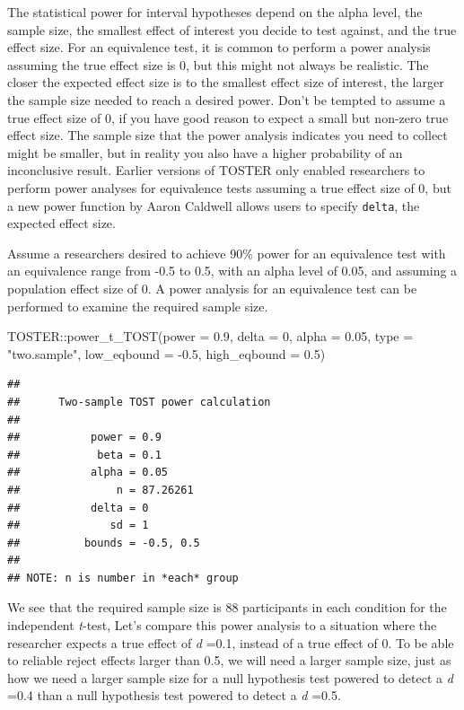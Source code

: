 \documentclass[
  oneside]{book}
\newenvironment{Shaded}{\begin{snugshade}}{\end{snugshade}}
\newcommand{\AttributeTok}[1]{\textcolor[rgb]{0.77,0.63,0.00}{#1}}
\newcommand{\DecValTok}[1]{\textcolor[rgb]{0.00,0.00,0.81}{#1}}
\newcommand{\FloatTok}[1]{\textcolor[rgb]{0.00,0.00,0.81}{#1}}
\newcommand{\FunctionTok}[1]{\textcolor[rgb]{0.00,0.00,0.00}{#1}}
\newcommand{\NormalTok}[1]{#1}
\newcommand{\SpecialCharTok}[1]{\textcolor[rgb]{0.00,0.00,0.00}{#1}}
\newcommand{\StringTok}[1]{\textcolor[rgb]{0.31,0.60,0.02}{#1}}
\begin{document}
The statistical power for interval hypotheses depend on the alpha level, the sample size, the smallest effect of interest you decide to test against, and the true effect size. For an equivalence test, it is common to perform a power analysis assuming the true effect size is 0, but this might not always be realistic. The closer the expected effect size is to the smallest effect size of interest, the larger the sample size needed to reach a desired power. Don't be tempted to assume a true effect size of 0, if you have good reason to expect a small but non-zero true effect size. The sample size that the power analysis indicates you need to collect might be smaller, but in reality you also have a higher probability of an inconclusive result. Earlier versions of TOSTER only enabled researchers to perform power analyses for equivalence tests assuming a true effect size of 0, but a new power function by Aaron Caldwell allows users to specify \texttt{delta}, the expected effect size.

Assume a researchers desired to achieve 90\% power for an equivalence test with an equivalence range from -0.5 to 0.5, with an alpha level of 0.05, and assuming a population effect size of 0. A power analysis for an equivalence test can be performed to examine the required sample size.

\begin{Shaded}
\begin{Highlighting}[]
\NormalTok{TOSTER}\SpecialCharTok{::}\FunctionTok{power\_t\_TOST}\NormalTok{(}\AttributeTok{power =} \FloatTok{0.9}\NormalTok{, }\AttributeTok{delta =} \DecValTok{0}\NormalTok{,}
                     \AttributeTok{alpha =} \FloatTok{0.05}\NormalTok{, }\AttributeTok{type =} \StringTok{"two.sample"}\NormalTok{,}
                     \AttributeTok{low\_eqbound =} \SpecialCharTok{{-}}\FloatTok{0.5}\NormalTok{, }\AttributeTok{high\_eqbound =} \FloatTok{0.5}\NormalTok{)}
\end{Highlighting}
\end{Shaded}

\begin{verbatim}
## 
##      Two-sample TOST power calculation 
## 
##           power = 0.9
##            beta = 0.1
##           alpha = 0.05
##               n = 87.26261
##           delta = 0
##              sd = 1
##          bounds = -0.5, 0.5
## 
## NOTE: n is number in *each* group
\end{verbatim}

We see that the required sample size is 88 participants in each condition for the independent \emph{t}-test, Let's compare this power analysis to a situation where the researcher expects a true effect of \emph{d} =0.1, instead of a true effect of 0. To be able to reliable reject effects larger than 0.5, we will need a larger sample size, just as how we need a larger sample size for a null hypothesis test powered to detect a \emph{d} =0.4 than a null hypothesis test powered to detect a \emph{d} =0.5.
\end{document}
